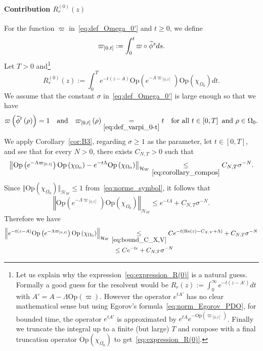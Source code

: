 \documentclass[10pt]{amsart}
\theoremstyle{definition}\newtheorem{defi}[theo]{Definition}\newtheorem{rema}[theo]{Remark}\newtheorem{exam}[theo]{Example}\newtheorem{exem}[theo]{Example}\newtheorem{nota}[theo]{Notation}
\newcommand{\clH}{\mathcal{H}}
\newcommand{\Ree}{\mathrm{Re}}
\newcommand{\Opp}{\mathrm{Op}}
\let\oldtilde\tilde
\renewcommand*{\tilde}[1]{\mathchoice{\widetilde{#1}}{\widetilde{#1}}{\oldtilde{#1}}{\oldtilde{#1}}}
\begin{document}
\paragraph{Contribution $R_{r}^{(0)}(z)$}\label{par:Contribution}

For the function $\varpi$ in~\eqref{eq:def_Omega_0'} and $t\geq0$, we define
\begin{equation}\label{eq:def_varpi_0-t}
\varpi_{\left[0,t\right]}:=\int_{0}^{t}\varpi\circ\tilde{\phi}^{s}ds.
\end{equation}
Let $T>0$ and\footnote{Let us explain why the expression~\eqref{eq:expression_R(0)} is a natural guess. Formally a good guess for the resolvent would be $R_{r}(z):=\int_{0}^{\infty}e^{-t(z-A')}dt$ with $A'=A-\Lambda\Opp (\varpi)$. However the operator $e^{tA'}$ has no clear mathematical sense but using Egorov's formula~\eqref{eq:norm_Egorov_PDO}, for bounded time, the operator $e^{tA'}$ is approximated by $e^{tA}e^{-\Opp (\varpi_{[0,t]})}$. Finally we truncate the integral up to a finite (but large) $T$ and compose with a final truncation operator $\Opp (\chi_{\Omega_{0}})$ to get~\eqref{eq:expression_R(0)}.}
\begin{equation}\label{eq:expression_R(0)}
R_{r}^{\left(0\right)}\left(z\right):=\int_{0}^{T}e^{-t\left(z-A\right)}\Opp \left(e^{-\Lambda\varpi_{\left[0,t\right]}}\right)\Opp \left(\chi_{\Omega_{0}}\right)dt.
\end{equation}
We assume that the constant $\sigma$ in~\eqref{eq:def_Omega_0'} is large enough so that we have
\[
\varpi\left(\tilde{\phi}^{t}\left(\rho\right)\right)=1\quad\text{and}\quad\varpi_{\left[0,t\right]}\left(\rho\right)\underset{\eqref{eq:def_varpi_0-t}}{=}t\quad\text{for all }t\in\left[0,T\right]\text{ and }\rho\in\Omega_{0}.
\]
We apply Corollary~\ref{cor:B3}, regarding $\sigma\geq1$ as the parameter, let $t\in[0,T]$, and see that for every $N>0$, there exists $C_{N,T}>0$ such that
\[
\left\Vert \Opp \left(e^{-\Lambda\varpi_{\left[0,t\right]}}\right)\Opp \left(\chi_{\Omega_{0}}\right)-e^{-t\Lambda}\Opp \left(\chi_{\Omega_{0}}\right)\right\Vert _{\clH _{W}}\underset{\eqref{eq:corollary_compos}}{\leq}C_{N,T}\sigma^{-N}.
\]
Since $\Vert \Opp (\chi_{\Omega_{0}})\Vert _{\clH _{W}}\leq1$ from~\eqref{eq:norme_symbol}, it follows that
\[
\left\Vert \Opp \left(e^{-\Lambda\varpi_{\left[0,t\right]}}\right)\Opp \left(\chi_{\Omega_{0}}\right)\right\Vert _{\clH _{W}}\leq e^{-t\Lambda}+C_{N,T}\sigma^{-N}.
\]
Therefore we have
\begin{equation}\label{eq:res5}
\begin{split}
\left\Vert e^{-t\left(z-A\right)}\Opp \left(e^{-\Lambda\varpi_{\left[0,t\right]}}\right)\Opp \left(\chi_{\Omega_{0}}\right)\right\Vert _{\clH _{W}} & \underset{\eqref{eq:bound_C_X,V}}{\leq}Ce^{-t\left(\Ree\left(z\right)-C_{X,V}+\Lambda\right)}+C_{N,T}\sigma^{-N}\\
& \mkern10mu\le Ce^{-t\epsilon}+C_{N,T}\sigma^{-N}
\end{split}
\end{equation}
\end{document}
